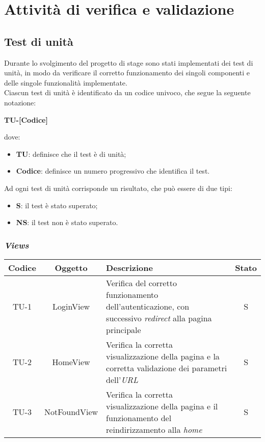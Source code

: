 \chapter{Attività di verifica e validazione}\label{cap:verifica-validazione}


\section{Test di unità}\label{sec:test-unita}
Durante lo svolgimento del progetto di stage sono stati implementati dei test di unità, in modo da verificare il corretto funzionamento
dei singoli componenti e delle singole funzionalità implementate.\\
Ciascun test di unità è identificato da un codice univoco, che segue la seguente notazione:
\begin{center}
  \textbf{TU-[Codice]}
\end{center}
dove:
\begin{itemize}
  \item \textbf{TU}: definisce che il test è di unità;
  \item \textbf{Codice}: definisce un numero progressivo che identifica il test.
\end{itemize}
Ad ogni test di unità corrisponde un risultato, che può essere di due tipi:
\begin{itemize}
  \item \textbf{S}: il test è stato superato;
  \item \textbf{NS}: il test non è stato superato.
\end{itemize}

\clearpage
\subsection*{\emph{Views}}\label{subsec:test-unita-views}

\begin{center}
  \label{tab:test-unita-views}
  \begin{longtable}{|c|c|p{}|c|}
  \hline
  \textbf{Codice} & \textbf{Oggetto} & \textbf{Descrizione} & \textbf{Stato}\\
  \hline
  TU-1 &LoginView &Verifica del corretto funzionamento dell'autenticazione, con successivo \textit{redirect} alla pagina principale &S \\
  \hline
  TU-2 &HomeView &Verifica la corretta visualizzazione della pagina e la corretta validazione dei parametri dell'\textit{URL} &S \\
  \hline
  TU-3 &NotFoundView &Verifica la corretta visualizzazione della pagina e il funzionamento del reindirizzamento alla \textit{home} &S \\
  \hline
\end{longtable}
\end{center}

